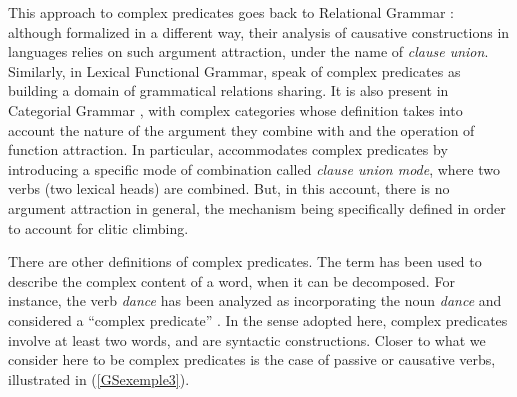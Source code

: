 	\label{GSexemple1b}  
		
	\label{GSexemple1c} 
\zl


\eal 
	\label{GSexemple2} 
	\label{GSexemple2a}
		
	\label{GSexemple2b}
		
		
	\label{GSexemple2c}			
\zl


\noindent
This approach to complex predicates goes back to Relational Grammar \citep{aissen1983clause}: although formalized in a different way, their analysis of causative constructions in  languages relies on such argument attraction, under the name of \emph{clause union}. Similarly, in Lexical Functional Grammar, \citet{andrews1999complex} speak of complex predicates as building a domain of grammatical relations sharing. It is also present in Categorial Grammar \citep{Geach70a}, with complex categories whose definition takes into account the nature of the argument they combine with and the operation of function attraction. In particular, \citet[301]{kraak1998deductive} accommodates complex predicates by introducing a specific mode of combination called \emph{clause union mode}, where two verbs (two lexical heads) are combined. But, in this account, there is no argument attraction in general, the mechanism being specifically defined in order to account for clitic climbing.


There are other definitions of complex predicates. The term has been used to describe the complex
content of a word, when it can be decomposed. For instance, the verb \emph{dance} has been analyzed
as incorporating the noun \emph{dance} and considered a ``complex predicate'' \citep[31, 41]{HK97a-u}. In the sense adopted here, complex predicates involve at least two words, and are syntactic constructions. Closer to what we consider here to be complex predicates is the case of  passive or causative verbs, illustrated in (\ref{GSexemple3}).

